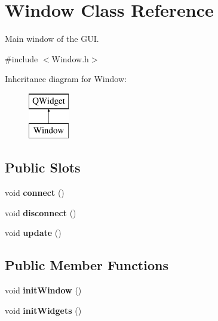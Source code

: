 \hypertarget{classWindow}{\section{Window Class Reference}
\label{classWindow}
}


Main window of the G\-U\-I.  




{\ttfamily \#include $<$Window.\-h$>$}

Inheritance diagram for Window\-:\begin{figure}[H]
\begin{center}
\leavevmode
\includegraphics[height=2.000000cm]{classWindow}
\end{center}
\end{figure}
\subsection*{Public Slots}
\begin{DoxyCompactItemize}
\item 
\hypertarget{classWindow_a2733bcfa9a07113324b66e01a89a1fb8}{void {\bfseries connect} ()}\label{classWindow_a2733bcfa9a07113324b66e01a89a1fb8}

\item 
\hypertarget{classWindow_a96a44a2584b9848d058aadff91ce4d20}{void {\bfseries disconnect} ()}\label{classWindow_a96a44a2584b9848d058aadff91ce4d20}

\item 
\hypertarget{classWindow_a59515fc5a56e86d5a46d771595daac55}{void {\bfseries update} ()}\label{classWindow_a59515fc5a56e86d5a46d771595daac55}

\end{DoxyCompactItemize}
\subsection*{Public Member Functions}
\begin{DoxyCompactItemize}
\item 
\hypertarget{classWindow_aad5118913017eb418cab8b4c216f57aa}{void {\bfseries init\-Window} ()}\label{classWindow_aad5118913017eb418cab8b4c216f57aa}

\item 
\hypertarget{classWindow_af2ff981e828f1aa24957e8080fed33a4}{void {\bfseries init\-Widgets} ()}\label{classWindow_af2ff981e828f1aa24957e8080fed33a4}

\end{DoxyCompactItemize}


